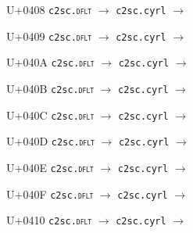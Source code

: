 \documentclass{article}
\begin{document}
\begin{substitutions}
\goodbreak

U+0408  \linebreak
    \texttt{c2sc.\textsc{dflt}} $\to$  \linebreak
    \texttt{c2sc.cyrl} $\to$  

\goodbreak

U+0409  \linebreak
    \texttt{c2sc.\textsc{dflt}} $\to$  \linebreak
    \texttt{c2sc.cyrl} $\to$  

\goodbreak

U+040A  \linebreak
    \texttt{c2sc.\textsc{dflt}} $\to$  \linebreak
    \texttt{c2sc.cyrl} $\to$  

\goodbreak

U+040B  \linebreak
    \texttt{c2sc.\textsc{dflt}} $\to$  \linebreak
    \texttt{c2sc.cyrl} $\to$  

\goodbreak

U+040C  \linebreak
    \texttt{c2sc.\textsc{dflt}} $\to$  \linebreak
    \texttt{c2sc.cyrl} $\to$  

\goodbreak

U+040D  \linebreak
    \texttt{c2sc.\textsc{dflt}} $\to$  \linebreak
    \texttt{c2sc.cyrl} $\to$  

\goodbreak

U+040E  \linebreak
    \texttt{c2sc.\textsc{dflt}} $\to$  \linebreak
    \texttt{c2sc.cyrl} $\to$  

\goodbreak

U+040F  \linebreak
    \texttt{c2sc.\textsc{dflt}} $\to$  \linebreak
    \texttt{c2sc.cyrl} $\to$  

\goodbreak

U+0410  \linebreak
    \texttt{c2sc.\textsc{dflt}} $\to$  \linebreak
    \texttt{c2sc.cyrl} $\to$  


\end{substitutions}
\end{document}
